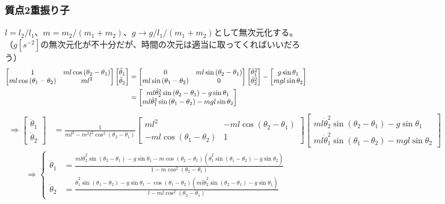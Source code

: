 \documentclass{jsarticle}
\newcommand{\eqa}[1]{\begin{align}#1\end{align}}
\newcommand{\so}{\Rightarrow}
\newcommand{\cost}[2]{\cos\left(\theta_{#1}-\theta_{#2}\right)}
\newcommand{\coste}[3]{\cos^{#3}\left(\theta_{#1}-\theta_{#2}\right)}
\newcommand{\sint}[2]{\sin\left(\theta_{#1}-\theta_{#2}\right)}
\newcommand{\dott}[1]{\dot{\theta}_{#1}}
\newcommand{\ddott}[1]{\ddot{\theta}_{#1}}
\begin{document}
\subsubsection{質点2重振り子}

$l = l_2 / l_1$、$m = m_2 / (m_1 + m_2)$、$g \rightarrow g / l_1 / (m_1 + m_2)$として無次元化する。
（$g[s^{-2}]$の無次元化が不十分だが、時間の次元は適当に取ってくればいいだろう）
\eqa{
	\begin{bmatrix}
		1 & m l \cost{2}{1} \\
		m l \cost{1}{2} & m l^2
	\end{bmatrix}
	\begin{bmatrix}
		\ddott{1} \\ \ddott{2}
	\end{bmatrix}
	&=
	\begin{bmatrix}
		0 & m l \sint{2}{1} \\
		m l \sint{1}{2} & 0
	\end{bmatrix}
	\begin{bmatrix}
		\dott{1}^2 \\ \dott{2}^2
	\end{bmatrix}
	-
	\begin{bmatrix}
		g \sin\theta_1 \\ m g l \sin\theta_2
	\end{bmatrix} \notag\\
	&=
	\begin{bmatrix}
		m l \dott{2}^2 \sint{2}{1} - g \sin\theta_1 \\
		m l \dott{1}^2 \sint{1}{2} - m g l \sin\theta_2
	\end{bmatrix} \notag
}
\eqa{
	\so
	\begin{bmatrix}
		\ddott{1} \\ \ddott{2}
	\end{bmatrix}
	&=
	\frac{1}{m l^2 - m^2 l^2 \coste{2}{1}{2}}
	\begin{bmatrix}
		m l^2 & -m l \cost{2}{1} \\
		-m l \cost{1}{2} & 1
	\end{bmatrix}
	\begin{bmatrix}
		m l \dott{2}^2 \sint{2}{1} - g \sin\theta_1 \\
		m l \dott{1}^2 \sint{1}{2} - m g l \sin\theta_2
	\end{bmatrix}
}
\eqa{
	\so
	\begin{cases}
		\ddott{1} &= \frac{m l \dott{2}^2 \sint{2}{1} - g \sin\theta_1 - m \cost{2}{1}\left(\dott{1}^2 \sint{1}{2} - g \sin\theta_2\right)}{1 - m \coste{2}{1}{2}} \\
		\ddott{2} &= \frac{\dott{1}^2 \sint{1}{2} - g \sin\theta_1 - \cost{1}{2}\left(m l \dott{2}^2 \sint{2}{1} - g \sin\theta_1\right)}{l - m l \coste{2}{1}{2}}
	\end{cases}
}
\end{document}
